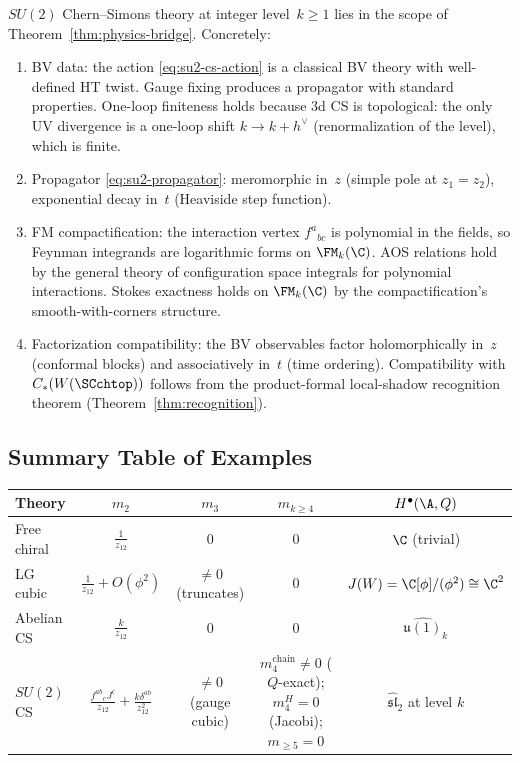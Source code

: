 \begin{proposition}
$SU(2)$ Chern--Simons theory at integer level~$k \geq 1$ lies
in the scope of Theorem~\ref{thm:physics-bridge}. Concretely:
\begin{enumerate}[label=\textup{(H\arabic*)}]
\item BV data: the action \eqref{eq:su2-cs-action} is a
 classical BV theory with well-defined HT twist. Gauge fixing
 produces a propagator with standard properties. One-loop
 finiteness holds because 3d CS is topological: the only
 UV divergence is a one-loop shift $k \to k + h^\vee$
 (renormalization of the level), which is finite.
\item Propagator \eqref{eq:su2-propagator}: meromorphic in~$z$
 (simple pole at $z_1 = z_2$), exponential decay in~$t$
 (Heaviside step function).
\item FM compactification: the interaction vertex $f^a{}_{bc}$
 is polynomial in the fields, so Feynman integrands are
 logarithmic forms on $\FM_k(\C)$. AOS relations hold by the
 general theory of configuration space integrals for
 polynomial interactions. Stokes exactness holds on
 $\FM_k(\C)$ by the compactification's smooth-with-corners
 structure.
\item Factorization compatibility: the BV observables factor
 holomorphically in~$z$ (conformal blocks) and associatively
 in~$t$ (time ordering). Compatibility with
 $C_\ast(W(\SCchtop))$ follows from the product-formal local-shadow
 recognition theorem (Theorem~\ref{thm:recognition}).
\end{enumerate}
\end{proposition}

\subsection{Summary Table of Examples}

\begin{center}
\begin{tabular}{|l|c|c|c|c|}
\hline
\textbf{Theory} & $m_2$ & $m_3$ & $m_{k \geq 4}$ & $H^\bullet(\A, Q)$ \\
\hline
Free chiral & $\frac{1}{z_{12}}$ & $0$ & $0$ & $\C$ (trivial) \\
\hline
LG cubic & $\frac{1}{z_{12}} + O(\phi^2)$ & $\neq 0$ (truncates) & $0$ & $J(W) = \C[\phi]/(\phi^2) \cong \C^2$ \\
\hline
Abelian CS & $\frac{k}{z_{12}}$ & $0$ & $0$ & $\widehat{\mathfrak{u}(1)}_k$ \\
\hline
$SU(2)$ CS & $\frac{f^{ab}{}_c J^c}{z_{12}} + \frac{k\delta^{ab}}{z_{12}^2}$ & $\neq 0$ (gauge cubic) & $m_4^{\mathrm{chain}} \neq 0$ ($Q$-exact); $m_4^H = 0$ (Jacobi); $m_{\geq 5} = 0$ & $\widehat{\mathfrak{sl}}_2$ at level $k$ \\
\hline
\end{tabular}
\end{center}

